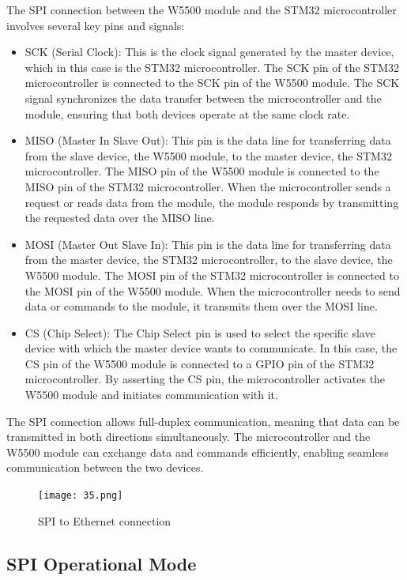 \documentclass[
12pt,
oneside, 
onehalfspacing, 
nolistspacing, 
parskip, 
chapterinoneline, 
]{AASTCOMPUTER}
\begin{document}
The SPI connection between the W5500 module and the STM32 microcontroller involves several key pins and signals:
\begin{itemize}
\item SCK (Serial Clock): This is the clock signal generated by the master device, which in this case is the STM32 microcontroller. The SCK pin of the STM32 microcontroller is connected to the SCK pin of the W5500 module. The SCK signal synchronizes the data transfer between the microcontroller and the module, ensuring that both devices operate at the same clock rate.
\item MISO (Master In Slave Out): This pin is the data line for transferring data from the slave device, the W5500 module, to the master device, the STM32 microcontroller. The MISO pin of the W5500 module is connected to the MISO pin of the STM32 microcontroller. When the microcontroller sends a request or reads data from the module, the module responds by transmitting the requested data over the MISO line.
\item MOSI (Master Out Slave In): This pin is the data line for transferring data from the master device, the STM32 microcontroller, to the slave device, the W5500 module. The MOSI pin of the STM32 microcontroller is connected to the MOSI pin of the W5500 module. When the microcontroller needs to send data or commands to the module, it transmits them over the MOSI line.
\item CS (Chip Select): The Chip Select pin is used to select the specific slave device with which the master device wants to communicate. In this case, the CS pin of the W5500 module is connected to a GPIO pin of the STM32 microcontroller. By asserting the CS pin, the microcontroller activates the W5500 module and initiates communication with it.
\end{itemize}

The SPI connection allows full-duplex communication, meaning that data can be transmitted in both directions simultaneously. The microcontroller and the W5500 module can exchange data and commands efficiently, enabling seamless communication between the two devices.
\begin{figure}[!ht]
\centering
\texttt{[image: 35.png]}
\caption[SPI to Ethernet connection]{SPI to Ethernet connection}
\label{fig:TCU}
\end{figure}
\subsection{SPI Operational Mode}
\end{document}
